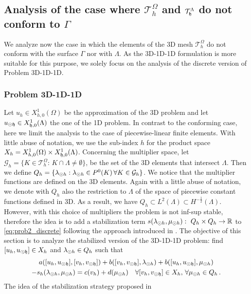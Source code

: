 \documentclass[r]{siamart171218}
\newcommand{\kentold}[1]{{\color{black}#1}}
\begin{document}
\subsection{Analysis of the case where $\mathcal{T}^{\Omega}_h$ and $\mathcal{T}^{\Lambda}_{\mathfrak{h}}$ do not conform to $\Gamma$} \label{sec:unfit2}
We analyze now the case in which the elements of the 3D mesh $\mathcal{T}^{\Omega}_h$
do not conform with the surface $\Gamma$ nor with $\Lambda$. 
As the 3D-1D-1D formulation is more suitable for this purpose,
we solely focus on the analysis of the discrete version of Problem 3D-1D-1D.

\subsubsection{Problem 3D-1D-1D} 
Let $u_h \in X_{h,0}^1(\Omega)$ be the approximation of the 3D problem
and let $u_{\odot \mathfrak{h}} \in X_{\mathfrak{h},0}^1(\Lambda)$ the one of the 1D problem.
In contrast to the conforming case, 
here we limit the analysis to the case of piecewise-linear finite elements. 
With little abuse of notation, we use the sub-index $h$ for the product space 
$X_h = X_{h,0}^1(\Omega) \times X_{\mathfrak{h},0}^1(\Lambda)$.
Concerning the multiplier space, let $\mathcal{G}_h = \{K \in \mathcal{T}^{\Omega}_h: \, K\cap \Lambda \neq \emptyset\}$, be the set of the 3D elements that intersect $\Lambda$. Then we define $Q_h=\{\lambda_{\odot h} : \lambda_{\odot h} \in P^0(K) \, \forall K \in \mathcal{G}_h\}$. We notice that the multiplier functions are defined on the 3D elements. Again with a little abuse of notation, we denote with $Q_h$ also the restriction to $\Lambda$ of the space of piecewise constant functions defined in 3D. As a result, we have $Q_h \subset L^2(\Lambda) \subset H^{-\frac12}(\Lambda)$.
However, with this choice of multipliers the problem is not inf-sup stable, therefore the idea is to add a stabilization term $s(\lambda_{\odot h}, \mu_{\odot h}): \ Q_h \times Q_h \rightarrow \mathbb{R}$ to \eqref{eq:prob2_discrete} following the approach introduced in \cite{burman2014}. 
The objective of this section is to analyze the stabilized version of the 3D-1D-1D problem: find $[u_h, \kentold{\udfh]} \in X_h$ and $\lambda_{\odot h} \in Q_h$ such that
\begin{multline}\label{eq:prob2_stabilized}
a([u_h, \udfh], [v_h, \vdfh]) +
b([v_h, \vdfh], \ldh)
+ b([u_h, \udfh], \mdh)
\\
- s_h(\ldh, \mdh) 
= c(v_h) + d(\mdh)
  \quad \forall [v_h, \vdfh] \in X_h, \,
  \forall \mdh \in Q_h\,.
\end{multline}
The idea of the stabilization strategy proposed in \cite{burman2014}
\end{document}
